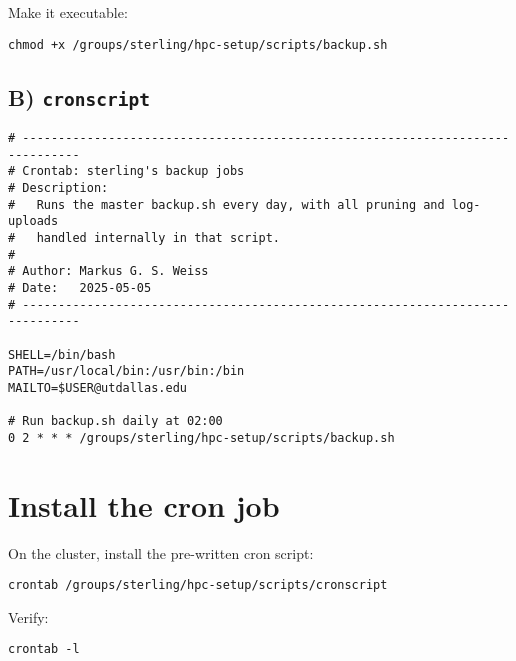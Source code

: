 \documentclass[12pt,letterpaper]{article}
\begin{document}
Make it executable:
\begin{lstlisting}[style=custombash]
chmod +x /groups/sterling/hpc-setup/scripts/backup.sh
\end{lstlisting}

\subsection{B) \texttt{cronscript}}
\begin{lstlisting}[style=custombash]
# ------------------------------------------------------------------------------
# Crontab: sterling's backup jobs
# Description:
#   Runs the master backup.sh every day, with all pruning and log-uploads
#   handled internally in that script.
#
# Author: Markus G. S. Weiss
# Date:   2025-05-05
# ------------------------------------------------------------------------------

SHELL=/bin/bash
PATH=/usr/local/bin:/usr/bin:/bin
MAILTO=$USER@utdallas.edu

# Run backup.sh daily at 02:00
0 2 * * * /groups/sterling/hpc-setup/scripts/backup.sh
\end{lstlisting}

\section{Install the cron job}
\label{sec:install-cron}
On the cluster, install the pre-written cron script:
\begin{lstlisting}[style=custombash]
crontab /groups/sterling/hpc-setup/scripts/cronscript
\end{lstlisting}
Verify:
\begin{lstlisting}[style=custombash]
crontab -l
\end{lstlisting}
\end{document}
